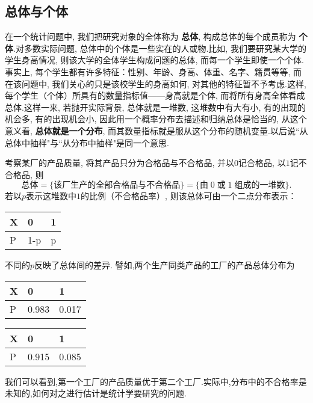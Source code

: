 \subsection{总体与个体\label{ssec:5.1.1}}
在一个统计问题中, 我们把研究对象的全体称为 \textbf{总体}, 构成总体的每个成员称为 \textbf{个体}.对多数实际问题, 总体中的个体是一些实在的人或物.比如, 我们要研究某大学的学生身高情况, 则该大学的全体学生构成问题的总体, 而每一个学生即使一个个体.事实上, 每个学生都有许多特征：性别、年龄、身高、体重、名字、籍贯等等, 而在该问题中, 我们关心的只是该校学生的身高如何, 对其他的特征暂不予考虑.这样, 每个学生（个体）所具有的数量指标值——身高就是个体, 而将所有身高全体看成总体.这样一来, 若抛开实际背景, 总体就是一堆数, 这堆数中有大有小, 有的出现的机会多, 有的出现机会小, 因此用一个概率分布去描述和归纳总体是恰当的, 从这个意义看,  \textbf{总体就是一个分布}, 而其数量指标就是服从这个分布的随机变量.以后说``从总体中抽样"与``从分布中抽样"是同一个意思.
\begin{example}
考察某厂的产品质量, 将其产品只分为合格品与不合格品, 并以$0$记合格品, 以$1$记不合格品, 则
\[\text{总体}=\{\text{该厂生产的全部合格品与不合格品}\}=\{\text{由}\;0\;\text{或}\;1\;\text{组成的一堆数}\}.\]
若以$p$表示这堆数中$1$的比例（不合格品率）, 则该总体可由一个二点分布表示：
\begin{center}
\begin{tabularx}{0.4\textwidth}{Y|YY}
  X&0&1\\
  \hline
  P&1-p&p
  \end{tabularx}
\end{center}
不同的$p$反映了总体间的差异. 譬如,两个生产同类产品的工厂的产品总体分布为

\begin{minipage}{0.4\textwidth}
\centering
\begin{tabularx}{\textwidth}{Y|YY}
X&0&1\\
\hline
P&0.983&0.017
\end{tabularx}
\end{minipage}\hspace{3\ccwd}
\begin{minipage}{0.4\textwidth}
\centering
\begin{tabularx}{\textwidth}{Y|YY}
X&0&1\\
\hline
P&0.915&0.085
\end{tabularx}
\end{minipage}

我们可以看到,第一个工厂的产品质量优于第二个工厂.实际中,分布中的不合格率是未知的,如何对之进行估计是统计学要研究的问题.
\end{example}

